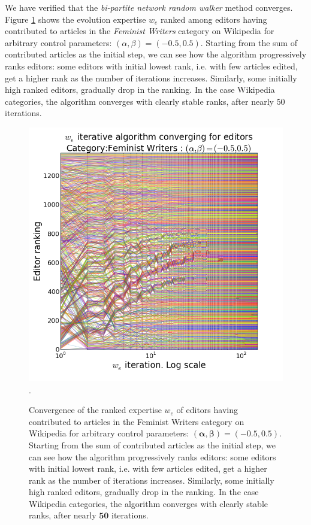 We have verified that the {\it bi-partite network random walker} method converges. Figure \ref{fig:convergence} shows the evolution expertise $w_e$ ranked among editors having contributed to articles in the {\it Feminist Writers} category on Wikipedia for arbitrary control parameters: $(\alpha,\beta) =(-0.5, 0.5)$. Starting from the sum of contributed articles as the initial step, we can see how the algorithm progressively ranks editors: some editors with initial lowest rank, i.e. with few articles edited, get a higher rank as the number of iterations increases. Similarly, some initially high ranked editors, gradually drop in the ranking. In the case Wikipedia categories, the algorithm converges with clearly stable ranks, after nearly $50$ iterations.

\begin{figure}[!t]
\centering
\includegraphics[width=0.9\columnwidth]{../Figures/fem_editors_iter_converge.png}.
\caption{Convergence of the ranked expertise $w_e$ of editors having contributed to articles in the Feminist Writers category on Wikipedia for arbitrary control parameters: $\mathbf{(\alpha,\beta) =(-0.5, 0.5)}$. Starting from the sum of contributed articles as the initial step, we can see how the algorithm progressively ranks editors: some editors with initial lowest rank, i.e. with few articles edited, get a higher rank as the number of iterations increases. Similarly, some initially high ranked editors, gradually drop in the ranking. In the case Wikipedia categories, the algorithm converges with clearly stable ranks, after nearly $\mathbf{50}$ iterations.}
\label{fig:convergence}
\end{figure}


